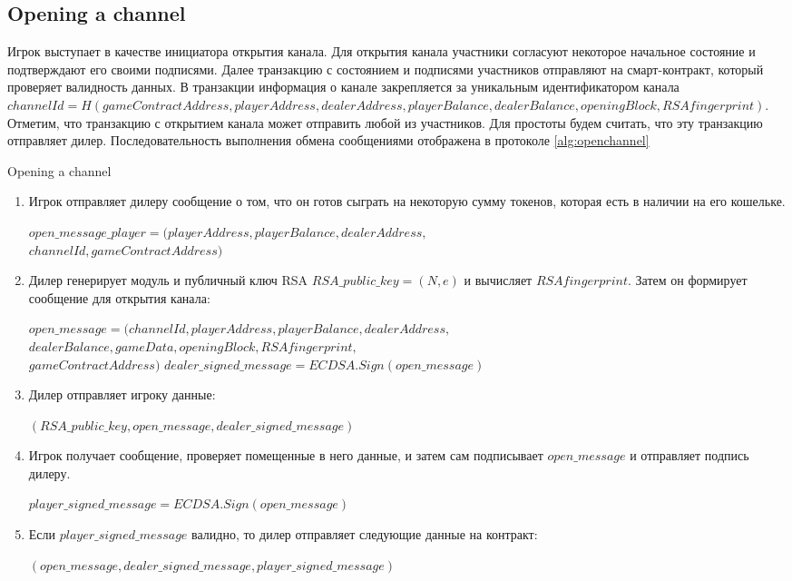 		\subsection {Opening a channel}
Игрок выступает в качестве инициатора открытия канала. Для открытия канала участники согласуют некоторое начальное состояние и подтверждают его своими подписями. Далее транзакцию с состоянием и подписями участников отправляют на смарт-контракт, который проверяет валидность данных. В транзакции информация о канале закрепляется за уникальным идентификатором канала $channelId = H(gameContractAddress, playerAddress, dealerAddress, playerBalance, dealerBalance, openingBlock, RSAfingerprint)$. Отметим, что транзакцию с открытием канала может отправить любой из участников. Для простоты будем считать, что эту транзакцию отправляет дилер. Последовательность выполнения обмена сообщениями отображена в протоколе \autoref {alg:openchannel}
\begin{algorithm}
\caption{Opening a channel} \label{alg:openchannel}
\begin{enumerate}
	\item Игрок отправляет дилеру сообщение о том, что он готов сыграть на некоторую сумму токенов, которая есть в наличии на его кошельке.
\begin{center}
	 $open\_message\_player = (playerAddress, playerBalance, dealerAddress,$\\$ channelId,gameContractAddress)$
\end{center}
	\item Дилер генерирует модуль и публичный ключ RSA $RSA\_public\_key= (N,e)$ и вычисляет $RSAfingerprint$. Затем он формирует сообщение для открытия канала:
\begin{center}
	 $open\_message = (channelId, playerAddress,  playerBalance, dealerAddress,$\\$dealerBalance, gameData, openingBlock, RSAfingerprint,$\\$gameContractAddress)$
	$dealer\_signed\_message = ECDSA.Sign(open\_message)$
\end{center}
	\item Дилер отправляет игроку данные:
\begin{center}
$(RSA\_public\_key, open\_message,dealer\_signed\_message)$
\end{center}
	\item Игрок получает сообщение, проверяет помещенные в него данные, и затем сам подписывает $open\_message$ и отправляет подпись дилеру.
\begin{center}
	$player\_signed\_message = ECDSA.Sign(open\_message)$
\end{center}
	\item Если $player\_signed\_message$ валидно, то дилер отправляет следующие данные на контракт:
\begin{center}
$(open\_message,dealer\_signed\_message,player\_signed\_message)$
\end{center}
\end{enumerate}
\end{algorithm}
